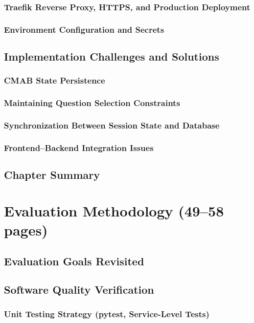 \documentclass[a4paper, 12pt, oneside, openany, BCOR1cm,toc=chapterentrywithdots]{scrbook}
\begin{document}
\subsection{Traefik Reverse Proxy, HTTPS, and Production Deployment}
\subsection{Environment Configuration and Secrets}
\section{Implementation Challenges and Solutions}
\subsection{CMAB State Persistence}
\subsection{Maintaining Question Selection Constraints}
\subsection{Synchronization Between Session State and Database}
\subsection{Frontend--Backend Integration Issues}
\section{Chapter Summary}

\chapter{Evaluation Methodology (49--58 pages)}
\label{chap:methodology}
% 
\section{Evaluation Goals Revisited}
\section{Software Quality Verification}
\subsection{Unit Testing Strategy (pytest, Service-Level Tests)}
\end{document}
